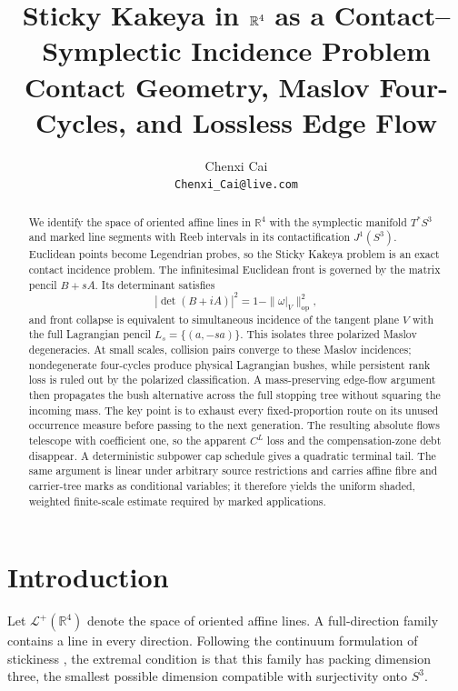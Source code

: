\documentclass[10pt]{article}
\title{Sticky Kakeya in $\R^4$ as a Contact--Symplectic Incidence Problem\\
\large Contact Geometry, Maslov Four-Cycles, and Lossless Edge Flow}
\author{Chenxi Cai\\[0.35em]\normalsize\texttt{Chenxi\_Cai@live.com}}
\date{}
\newcommand{\R}{\mathbb R}
\begin{document}
\allowdisplaybreaks[2]
\setlength{\emergencystretch}{3em}
\maketitle

\begin{abstract}
We identify the space of oriented affine lines in $\R^4$ with the symplectic manifold
$T^*S^3$ and marked line segments with Reeb intervals in its contactification
$J^1(S^3)$. Euclidean points become Legendrian probes, so the Sticky Kakeya problem is
an exact contact incidence problem. The infinitesimal Euclidean front is governed by the
matrix pencil $B+sA$. Its determinant satisfies
\[
 |\det(B+iA)|^2=1-\|\omega|_V\|_{\mathrm{op}}^2,
\]
and front collapse is equivalent to simultaneous incidence of the tangent plane $V$ with
the full Lagrangian pencil $L_s=\{(a,-sa)\}$. This isolates three polarized Maslov
degeneracies. At small scales, collision pairs converge to these Maslov incidences;
nondegenerate four-cycles produce physical Lagrangian bushes, while persistent rank loss
is ruled out by the polarized classification.  A mass-preserving edge-flow argument then
propagates the bush alternative across the full stopping tree without squaring the incoming mass.
The key point is to exhaust every fixed-proportion route on its unused occurrence measure before
passing to the next generation.  The resulting absolute flows telescope with coefficient one, so
the apparent $C^L$ loss and the compensation-zone debt disappear.  A deterministic subpower cap
schedule gives a quadratic terminal tail.  The same argument is linear under arbitrary source
restrictions and carries affine fibre and carrier-tree marks as conditional variables; it therefore
yields the uniform shaded, weighted finite-scale estimate required by marked applications.
\end{abstract}

\tableofcontents

\section{Introduction}

Let $\mathcal L^+(\R^4)$ denote the space of oriented affine lines. A full-direction
family contains a line in every direction. Following the continuum formulation of stickiness
\cite{KatzLabaTao2000,KatzTao2002,WangZahlSticky}, the extremal condition is that this family
has packing dimension three, the smallest possible dimension compatible with surjectivity onto
$S^3$.
\end{document}
